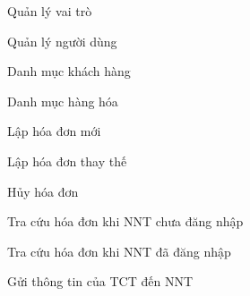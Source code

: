 Quản lý vai trò

Quản lý người dùng


Danh mục khách hàng

Danh mục hàng hóa


Lập hóa đơn mới

Lập hóa đơn thay thế

Hủy hóa đơn


Tra cứu hóa đơn khi NNT chưa đăng nhập

Tra cứu hóa đơn khi NNT đã đăng nhập


Gửi thông tin của TCT đến NNT